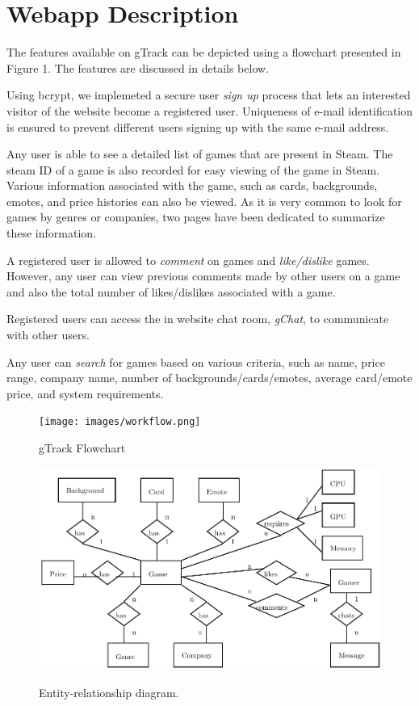 \chapter{Webapp Description}

The features available on gTrack can be depicted using a flowchart presented in Figure 1. The features are discussed in details below.

Using bcrypt, we implemeted a secure user \textit{sign up} process that lets an interested visitor of the website become a registered user. Uniqueness of e-mail identification is ensured to prevent different users signing up with the same e-mail address.

Any user is able to see a detailed list of games that are present in Steam. The steam ID of a game is also recorded for easy viewing of the game in Steam. Various information associated with the game, such as cards, backgrounds, emotes, and price histories can also be viewed. As it is very common to look for games by genres or companies, two pages have been dedicated to summarize these information.

A registered user is allowed to \textit{comment} on games and \textit{like/dislike} games. However, any user can view previous comments made by other users on a game and also the total number of likes/dislikes associated with a game.

Registered users can access the in website chat room, \textit{gChat}, to communicate with other users.

Any user can \textit{search} for games based on various criteria, such as name, price range, company name, number of backgrounds/cards/emotes, average card/emote price, and system requirements.

\begin {figure}
\centering
\texttt{[image: images/workflow.png]}   
\caption{gTrack Flowchart}
\vspace{\floatsep}
\includegraphics[width= 1\textwidth]{images/erd.pdf}   
\caption{Entity-relationship diagram.}\label{fig:erd}
\end{figure}

